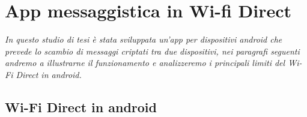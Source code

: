


\chapter{App messaggistica in Wi-fi Direct}

\begin{minipage}{12cm}\textit{
    In questo studio 
    di tesi è stata sviluppata un'app per
   dispositivi android che prevede lo scambio di
    messaggi criptati tra due dispositivi,
   nei paragrafi seguenti andremo a illustrarne il 
   funzionamento e analizzeremo
   i principali limiti del Wi-Fi Direct in android.}
\end{minipage}




\section{Wi-Fi Direct in android}

